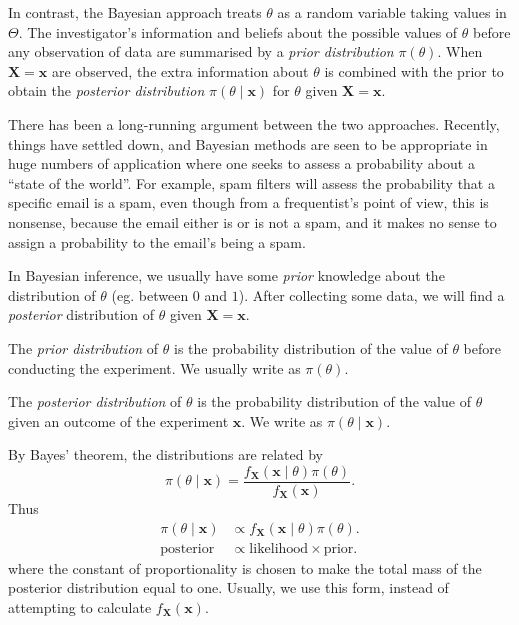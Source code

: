 \documentclass[a4paper]{article}
\begin{document}
In contrast, the Bayesian approach treats $\theta$ as a random variable taking values in $\Theta$. The investigator's information and beliefs about the possible values of $\theta$ before any observation of data are summarised by a \emph{prior distribution} $\pi(\theta)$. When $\mathbf{X} = \mathbf{x}$ are observed, the extra information about $\theta$ is combined with the prior to obtain the \emph{posterior distribution} $\pi(\theta\mid \mathbf{x})$ for $\theta$ given $\mathbf{X} = \mathbf{x}$.

There has been a long-running argument between the two approaches. Recently, things have settled down, and Bayesian methods are seen to be appropriate in huge numbers of application where one seeks to assess a probability about a ``state of the world''. For example, spam filters will assess the probability that a specific email is a spam, even though from a frequentist's point of view, this is nonsense, because the email either is or is not a spam, and it makes no sense to assign a probability to the email's being a spam.

In Bayesian inference, we usually have some \emph{prior} knowledge about the distribution of $\theta$ (eg. between $0$ and $1$). After collecting some data, we will find a \emph{posterior} distribution of $\theta$ given $\mathbf{X} = \mathbf{x}$.

\begin{defi}
  The \emph{prior distribution} of $\theta$ is the probability distribution of the value of $\theta$ before conducting the experiment. We usually write as $\pi(\theta)$.

  The \emph{posterior distribution} of $\theta$ is the probability distribution of the value of $\theta$ given an outcome of the experiment $\mathbf{x}$. We write as $\pi(\theta\mid \mathbf{x})$.
\end{defi}
By Bayes' theorem, the distributions are related by
\[
  \pi(\theta\mid \mathbf{x}) = \frac{f_{\mathbf{X}}(\mathbf{x}\mid \theta)\pi(\theta)}{f_{\mathbf{X}}(\mathbf{x})}.
\]
Thus
\begin{align*}
  \pi(\theta\mid \mathbf{x}) &\propto f_{\mathbf{X}}(\mathbf{x}\mid \theta)\pi(\theta).\\
  \text{posterior} &\propto \text{likelihood}\times\text{prior}.
\end{align*}
where the constant of proportionality is chosen to make the total mass of the posterior distribution equal to one. Usually, we use this form, instead of attempting to calculate $f_\mathbf{X}(\mathbf{x})$.
\end{document}
